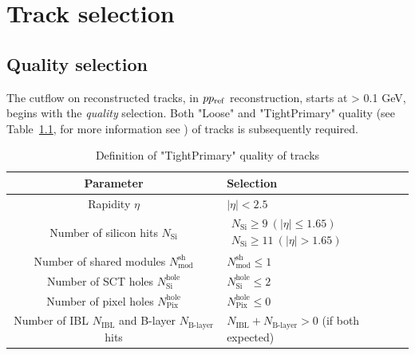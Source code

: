 \chapter{Track selection}
\label{chap:track_sel}

\section{Quality selection}

The cutflow on reconstructed tracks, in $pp_{\mathrm{ref}}$ reconstruction, starts at \pT > 0.1 GeV, begins with the \textit{quality} selection. Both "Loose" and "TightPrimary" quality (see Table~\ref{tab:tight_primary_quality}, for more information see \cite{tightprimaryQuality_Twiki}) of tracks is subsequently required.
\begin{table}[h]
    \centering
    \caption{Definition of "TightPrimary" quality of tracks}
    \begin{tabular}{c|l}
       Parameter & Selection  \\ \hline
       Rapidity $\eta$  & $|\eta| < 2.5$ \\
       Number of silicon hits $N_\text{Si}$ & $\begin{array}{l}
       N_\text{Si} \geq 9 \ (|\eta|\leq 1.65) \\
       N_\text{Si} \geq 11\ (|\eta|> 1.65)
       \end{array}$  \\
        Number of shared modules $N_\text{mod}^\text{sh}$ & $N_\text{mod}^\text{sh} \leq 1$ \\
        Number of SCT holes $N_\text{Si}^\text{hole}$ & $N_\text{Si}^\text{hole} \leq 2$ \\
        Number of pixel holes $N_\text{Pix}^\text{hole}$ & $N_\text{Pix}^\text{hole} \leq 0$ \\
        Number of IBL $N_\text{IBL}$ and B-layer $N_\text{B-layer}$ hits &  $N_\text{IBL}+N_\text{B-layer} > 0$ (if both expected)
    \end{tabular}
    \label{tab:tight_primary_quality}
\end{table}

